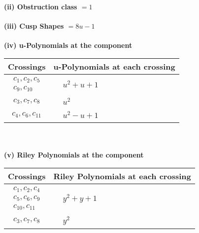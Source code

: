 \documentclass[1p]{elsarticle_modified}
\theoremstyle{definition}
\begin{document}
\flushleft \textbf{(ii) Obstruction class $= 1$}\\~\\
\flushleft \textbf{(iii) Cusp Shapes $= 8 u-1$}\\~\\
\newpage\renewcommand{\arraystretch}{1}
\flushleft \textbf{(iv) u-Polynomials at the component}\newline \\
\begin{tabular}{m{50pt}|m{274pt}}
Crossings & \hspace{64pt}u-Polynomials at each crossing \\
\hline $$\begin{aligned}c_{1},c_{2},c_{5}\\c_{9},c_{10}\end{aligned}$$&$\begin{aligned}
&u^2+u+1
\end{aligned}$\\
\hline $$\begin{aligned}c_{3},c_{7},c_{8}\end{aligned}$$&$\begin{aligned}
&u^2
\end{aligned}$\\
\hline $$\begin{aligned}c_{4},c_{6},c_{11}\end{aligned}$$&$\begin{aligned}
&u^2- u+1
\end{aligned}$\\
\hline
\end{tabular}\\~\\
\newpage\renewcommand{\arraystretch}{1}
\flushleft \textbf{(v) Riley Polynomials at the component}\newline \\
\begin{tabular}{m{50pt}|m{274pt}}
Crossings & \hspace{64pt}Riley Polynomials at each crossing \\
\hline $$\begin{aligned}c_{1},c_{2},c_{4}\\c_{5},c_{6},c_{9}\\c_{10},c_{11}\end{aligned}$$&$\begin{aligned}
&y^2+y+1
\end{aligned}$\\
\hline $$\begin{aligned}c_{3},c_{7},c_{8}\end{aligned}$$&$\begin{aligned}
&y^2
\end{aligned}$\\
\hline
\end{tabular}\\~\\
\end{document}
